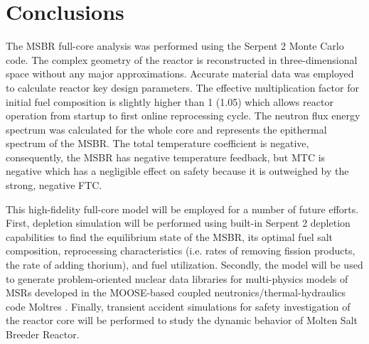 \documentclass{anstrans}
\begin{document}
\section{Conclusions}
The MSBR full-core analysis was performed using the Serpent 2 Monte Carlo code. The complex geometry of the reactor is reconstructed in three-dimensional space without any major approximations. Accurate material data was employed to calculate reactor key design parameters. The effective multiplication factor for initial fuel composition is slightly higher than 1 (1.05) which allows reactor operation from startup to first online reprocessing cycle. The neutron flux energy spectrum was calculated for the whole core and represents the epithermal spectrum of the MSBR. The total temperature coefficient is negative, consequently, the MSBR has negative temperature feedback, but MTC is negative which has a negligible effect on safety because it is outweighed by the strong, negative FTC.

This high-fidelity full-core model will be employed for a number of future efforts. First, depletion simulation will be performed using built-in Serpent 2 depletion capabilities to find the equilibrium state of the MSBR, its optimal fuel salt composition, reprocessing characteristics (i.e. rates of removing fission products, the rate of adding thorium), and fuel utilization. Secondly, the model will be used to generate problem-oriented nuclear data libraries for multi-physics models of MSRs developed in the MOOSE-based coupled neutronics/thermal-hydraulics code Moltres \cite{lindsay_arfc/moltres:_2017}. Finally, transient accident simulations for safety investigation of the reactor core will be performed to study the dynamic behavior of Molten Salt Breeder Reactor. 




\end{document}

